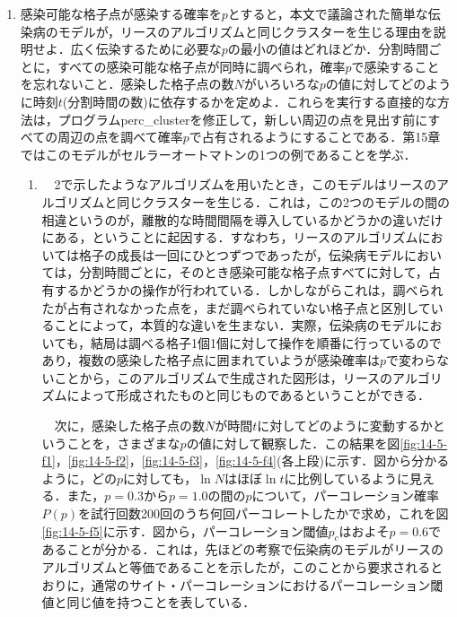 \documentclass{jsarticle}
\begin{document}
        \begin{enumerate}
            \renewcommand{\labelenumi}{\alph{enumi}.}
            \renewcommand{\labelenumii}{}
            
            \item 感染可能な格子点が感染する確率を$p$とすると，本文で議論された簡単な伝染病のモデルが，リースのアルゴリズムと同じクラスターを生じる理由を説明せよ．広く伝染するために必要な$p$の最小の値はどれほどか．分割時間ごとに，すべての感染可能な格子点が同時に調べられ，確率$p$で感染することを忘れないこと．感染した格子点の数$N$がいろいろな$p$の値に対してどのように時刻$t$(分割時間の数)に依存するかを定めよ．これらを実行する直接的な方法は，プログラムperc\_clusterを修正して，新しい周辺の点を見出す前にすべての周辺の点を調べて確率$p$で占有されるようにすることである．第15章ではこのモデルがセルラーオートマトンの1つの例であることを学ぶ．
                
            \begin{enumerate}
                \item \ \ 2で示したようなアルゴリズムを用いたとき，このモデルはリースのアルゴリズムと同じクラスターを生じる．これは，この2つのモデルの間の相違というのが，離散的な時間間隔を導入しているかどうかの違いだけにある，ということに起因する．すなわち，リースのアルゴリズムにおいては格子の成長は一回にひとつずつであったが，伝染病モデルにおいては，分割時間ごとに，そのとき感染可能な格子点すべてに対して，占有するかどうかの操作が行われている．しかしながらこれは，調べられたが占有されなかった点を，まだ調べられていない格子点と区別していることによって，本質的な違いを生まない．実際，伝染病のモデルにおいても，結局は調べる格子1個1個に対して操作を順番に行っているのであり，複数の感染した格子点に囲まれていようが感染確率は$p$で変わらないことから，このアルゴリズムで生成された図形は，リースのアルゴリズムによって形成されたものと同じものであるということができる．
                
                \ \ 次に，感染した格子点の数$N$が時間$t$に対してどのように変動するかということを，さまざまな$p$の値に対して観察した．この結果を図\ref{fig:14-5-f1}，\ref{fig:14-5-f2}，\ref{fig:14-5-f3}，\ref{fig:14-5-f4}(各上段)に示す．図から分かるように，どの$p$に対しても，$\ln N$はほぼ$\ln t$に比例しているように見える．また，$p=0.3$から$p=1.0$の間の$p$について，パーコレーション確率$P(p)$を試行回数200回のうち何回パーコレートしたかで求め，これを図\ref{fig:14-5-f5}に示す．図から，パーコレーション閾値$p_{c}$はおよそ$p=0.6$であることが分かる．これは，先ほどの考察で伝染病のモデルがリースのアルゴリズムと等価であることを示したが，このことから要求されるとおりに，通常のサイト・パーコレーションにおけるパーコレーション閾値と同じ値を持つことを表している．
                

\end{enumerate}
\end{enumerate}
\end{document}
